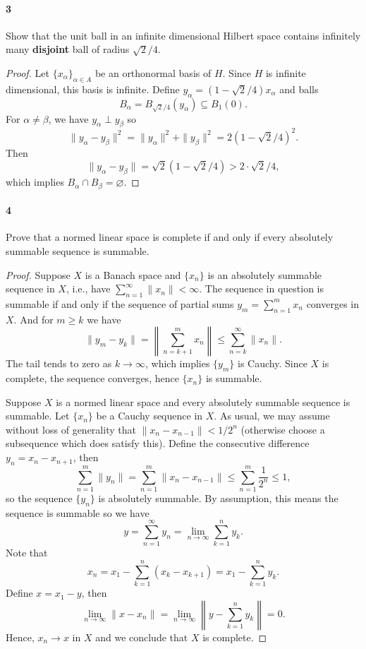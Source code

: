 \documentclass[12pt]{article}
\newlength{\myparskip}
\newenvironment{fullbox}{\begin{lrbox}{\savefullbox}\begin{minipage}{\dimexpr\textwidth-2\fboxsep\relax}\setlength{\parskip}{\myparskip}}{\end{minipage}\end{lrbox}\framebox[\textwidth]{\usebox{\savefullbox}}}
\newenvironment{pbox}[1][]{\begin{fullbox}\def\temp{#1}\ifx\temp\empty\else\paragraph{#1}\phantom{}\fi}{\end{fullbox}}
\theoremstyle{definition}
\renewcommand{\emptyset}{\varnothing}
\newcommand{\<}{\langle}
\renewcommand{\>}{\rangle}
\newcommand{\seq}{\subseteq}
\begin{document}
\newpage
\begin{pbox}[3]
    Show that the unit ball in an infinite dimensional Hilbert space contains infinitely many \textbf{disjoint} ball of radius $\sqrt{2}/4$.
\end{pbox}

\begin{proof}
    Let $\{x_\alpha\}_{\alpha \in A}$ be an orthonormal basis of $H$.
    Since $H$ is infinite dimensional, this basis is infinite.
    Define $y_\alpha = (1 - \sqrt{2}/4)x_\alpha$ and balls
    \[
        B_\alpha = B_{\sqrt{2}/4}(y_\alpha) \seq B_1(0).
    \]
    For $\alpha \ne \beta$, we have $y_\alpha \perp y_\beta$ so
    \[
        \|y_\alpha - y_\beta\|^2
            = \|y_\alpha\|^2 + \|y_\beta\|^2
            = 2(1 - \sqrt{2}/4)^2.
    \]
    Then
    \[
        \|y_\alpha - y_\beta\|
            = \sqrt{2}(1 - \sqrt{2}/4)
            > 2 \cdot \sqrt{2}/4,
    \]
    which implies $B_\alpha \cap B_\beta = \emptyset$.
\end{proof}


\newpage
\begin{pbox}[4]
    Prove that a normed linear space is complete if and only if every absolutely summable sequence is summable.
\end{pbox}

\begin{proof}
    Suppose $X$ is a Banach space and $\{x_n\}$ is an absolutely summable sequence in $X$, i.e., have $\sum_{n=1}^{\infty} \|x_n\| < \infty$.
    The sequence in question is summable if and only if the sequence of partial sums $y_m = \sum_{n=1}^{m} x_n$ converges in $X$.
    And for $m \geq k$ we have
    \[
        \|y_m - y_k\|
        = \left\|\sum_{n=k+1}^{m} x_n\right\|
        \leq \sum_{n=k}^{\infty} \|x_n\|.
    \]
    The tail tends to zero as $k \to \infty$, which implies $\{y_m\}$ is Cauchy.
    Since $X$ is complete, the sequence converges, hence $\{x_n\}$ is summable.

    Suppose $X$ is a normed linear space and every absolutely summable sequence is summable.
    Let $\{x_n\}$ be a Cauchy sequence in $X$.
    As usual, we may assume without loss of generality that $\|x_n - x_{n-1}\| < 1/2^n$ (otherwise choose a subsequence which does satisfy this).
    Define the consecutive difference $y_n = x_n - x_{n+1}$, then
    \[
        \sum_{n=1}^{m} \|y_n\|
            = \sum_{n=1}^{m} \|x_n - x_{n-1}\|
            \leq \sum_{n=1}^{m} \frac{1}{2^n}
            \leq 1,
    \]
    so the sequence $\{y_n\}$ is absolutely summable.
    By assumption, this means the sequence is summable so we have
    \[
        y
            = \sum_{n=1}^{\infty} y_n
            = \lim_{n \to \infty} \sum_{k=1}^{n} y_k.
    \]
    Note that
    \[
        x_n
            = x_1 - \sum_{k=1}^{n} (x_k - x_{k+1})
            = x_1 - \sum_{k=1}^n y_k.
    \]
    Define $x = x_1 - y$, then
    \[
        \lim_{n \to \infty} \|x - x_n\|
            = \lim_{n \to \infty} \left\|y - \sum_{k=1}^{n} y_k\right\|
            = 0.
    \]
    Hence, $x_n \to x$ in $X$ and we conclude that $X$ is complete.
\end{proof}
\end{document}
